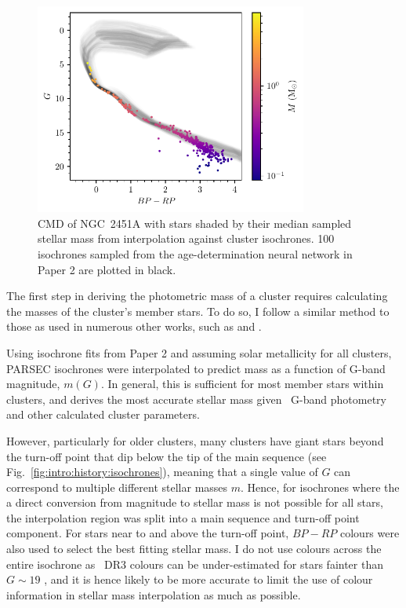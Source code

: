\begin{figure}[t]
    \centering
    \includegraphics[width=0.8\textwidth]{fig/c4/masses_stellar.pdf}
    \caption[CMD of NGC~2451A with stars shaded by their median sampled stellar mass]{CMD of NGC~2451A with stars shaded by their median sampled stellar mass from interpolation against cluster isochrones. 100 isochrones sampled from the age-determination neural network in Paper 2 are plotted in black.}
    \label{fig:dynamics:masses:stellar_masses}
 \end{figure}

 The first step in deriving the photometric mass of a cluster requires calculating the masses of the cluster's member stars. To do so, I follow a similar method to those as used in numerous other works, such as \cite{meingast_extended_2021} and \cite{cordoni_photometric_2023}.

Using isochrone fits from Paper 2 and assuming solar metallicity for all clusters, PARSEC isochrones \citep{bressan_parsec_2012} were interpolated to predict mass as a function of G-band magnitude, $m(G)$. In general, this is sufficient for most member stars within clusters, and derives the most accurate stellar mass given \gaia\ G-band photometry and other calculated cluster parameters. 
 
However, particularly for older clusters, many clusters have giant stars beyond the turn-off point that dip below the tip of the main sequence (see Fig.~\ref{fig:intro:history:isochrones}), meaning that a single value of $G$ can correspond to multiple different stellar masses $m$. Hence, for isochrones where the a direct conversion from magnitude to stellar mass is not possible for all stars, the interpolation region was split into a main sequence and turn-off point component. For stars near to and above the turn-off point, $BP-RP$ colours were also used to select the best fitting stellar mass. I do not use colours across the entire isochrone as \gaia\ DR3 colours can be under-estimated for stars fainter than $G\sim19$ \citep[especially in the BP band,][]{riello_gaia_2021}, and it is hence likely to be more accurate to limit the use of colour information in stellar mass interpolation as much as possible.

